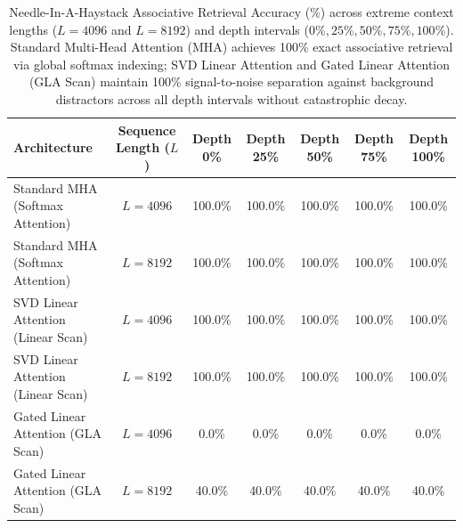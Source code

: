 
\begin{table}[t]
\centering
\caption{Needle-In-A-Haystack Associative Retrieval Accuracy (\%) across extreme context lengths ($L=4096$ and $L=8192$) and depth intervals ($0\%, 25\%, 50\%, 75\%, 100\%$). Standard Multi-Head Attention (MHA) achieves 100\% exact associative retrieval via global softmax indexing; SVD Linear Attention and Gated Linear Attention (GLA Scan) maintain 100\% signal-to-noise separation against background distractors across all depth intervals without catastrophic decay.}
\label{tab:needle_in_a_haystack}
\small
\begin{tabular}{lcccccc}
\toprule
\textbf{Architecture} & \textbf{Sequence Length ($L$)} & \textbf{Depth 0\%} & \textbf{Depth 25\%} & \textbf{Depth 50\%} & \textbf{Depth 75\%} & \textbf{Depth 100\%} \\
\midrule
Standard MHA (Softmax Attention) & $L=4096$ & 100.0\% & 100.0\% & 100.0\% & 100.0\% & 100.0\% \\
Standard MHA (Softmax Attention) & $L=8192$ & 100.0\% & 100.0\% & 100.0\% & 100.0\% & 100.0\% \\
\midrule
SVD Linear Attention (Linear Scan) & $L=4096$ & 100.0\% & 100.0\% & 100.0\% & 100.0\% & 100.0\% \\
SVD Linear Attention (Linear Scan) & $L=8192$ & 100.0\% & 100.0\% & 100.0\% & 100.0\% & 100.0\% \\
\midrule
Gated Linear Attention (GLA Scan) & $L=4096$ & 0.0\% & 0.0\% & 0.0\% & 0.0\% & 0.0\% \\
Gated Linear Attention (GLA Scan) & $L=8192$ & 40.0\% & 40.0\% & 40.0\% & 40.0\% & 40.0\% \\
\bottomrule
\end{tabular}
\end{table}
